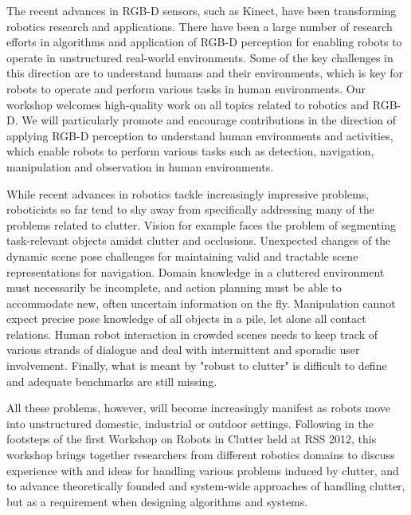 \begin{spacing}{1.0}
{
The recent advances in RGB-D sensors, such as Kinect, have been transforming robotics research and applications. There have been a large number of research efforts in algorithms and application of RGB-D perception for enabling robots to operate in unstructured real-world environments. Some of the key challenges in this direction are to understand humans and their environments, which is key for robots to operate and perform various tasks in human environments. Our workshop welcomes high-quality work on all topics related to robotics and RGB-D. We will particularly promote and encourage contributions in the direction of applying RGB-D perception to understand human environments and activities, which enable robots to perform various tasks such as detection, navigation, manipulation and observation in human environments. 
}


{
 While recent advances in robotics tackle increasingly impressive problems, roboticists so far tend to shy away from specifically addressing many of the problems related to clutter. Vision for example faces the problem of segmenting task-relevant objects amidst clutter and occlusions. Unexpected changes of the dynamic scene pose challenges for maintaining valid and tractable scene representations for navigation. Domain knowledge in a cluttered environment must necessarily be incomplete, and action planning must be able to accommodate new, often uncertain information on the fly. Manipulation cannot expect precise pose knowledge of all objects in a pile, let alone all contact relations. Human robot interaction in crowded scenes needs to keep track of various strands of dialogue and deal with intermittent and sporadic user involvement. Finally, what is meant by "robust to clutter" is difficult to define and adequate benchmarks are still missing.
 
All these problems, however, will become increasingly manifest as robots move into unstructured domestic, industrial or outdoor settings. Following in the footsteps of the first Workshop on Robots in Clutter held at RSS 2012, this workshop brings together researchers from different robotics domains to discuss experience with and ideas for handling various problems induced by clutter, and to advance theoretically founded and system-wide approaches of handling clutter, but as a requirement when designing algorithms and systems.

}
\end{spacing}
